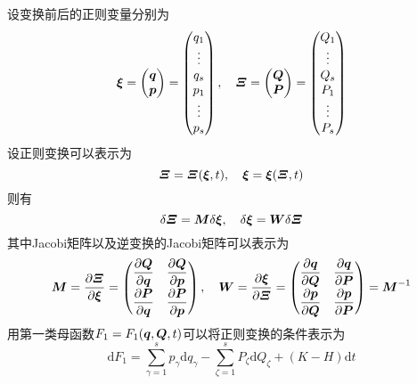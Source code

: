 设变换前后的正则变量分别为
\begin{equation*}
	\boldsymbol{\xi} = \begin{pmatrix} \boldsymbol{q} \\ \boldsymbol{p} \end{pmatrix} = \begin{pmatrix} q_1 \\ \vdots \\ q_s \\ p_1 \\ \vdots \\ p_s \end{pmatrix},\quad \boldsymbol{\mathnormal{\Xi}} = \begin{pmatrix} \boldsymbol{Q} \\ \boldsymbol{P} \end{pmatrix} = \begin{pmatrix} Q_1 \\ \vdots \\ Q_s \\ P_1 \\ \vdots \\ P_s \end{pmatrix}
\end{equation*}
设正则变换可以表示为
\begin{equation}
	\boldsymbol{\mathnormal{\Xi}} = \boldsymbol{\mathnormal{\Xi}}(\boldsymbol{\xi},t),\quad \boldsymbol{\xi} = \boldsymbol{\xi}(\boldsymbol{\mathnormal{\Xi}},t)
\end{equation}
则有
\begin{equation*}
	\delta \boldsymbol{\mathnormal{\Xi}} = \boldsymbol{M} \delta \boldsymbol{\xi},\quad \delta \boldsymbol{\xi} = \boldsymbol{W} \delta \boldsymbol{\mathnormal{\Xi}}
\end{equation*}
其中Jacobi矩阵以及逆变换的Jacobi矩阵可以表示为
\begin{equation}
	\boldsymbol{M} = \frac{\partial \boldsymbol{\mathnormal{\Xi}}}{\partial \boldsymbol{\xi}} = \begin{pmatrix} \dfrac{\partial \boldsymbol{Q}}{\partial \boldsymbol{q}} & \dfrac{\partial \boldsymbol{Q}}{\partial \boldsymbol{p}} \\[1.5ex] \dfrac{\partial \boldsymbol{P}}{\partial \boldsymbol{q}} & \dfrac{\partial \boldsymbol{P}}{\partial \boldsymbol{p}} \end{pmatrix},\quad \boldsymbol{W} = \frac{\partial \boldsymbol{\xi}}{\partial \boldsymbol{\mathnormal{\Xi}}} = \begin{pmatrix} \dfrac{\partial \boldsymbol{q}}{\partial \boldsymbol{Q}} & \dfrac{\partial \boldsymbol{q}}{\partial \boldsymbol{P}} \\[1.5ex] \dfrac{\partial \boldsymbol{p}}{\partial \boldsymbol{Q}} & \dfrac{\partial \boldsymbol{p}}{\partial \boldsymbol{P}} \end{pmatrix} = \boldsymbol{M}^{-1}
\end{equation}
用第一类母函数$F_1=F_1(\boldsymbol{q},\boldsymbol{Q},t)$可以将正则变换的条件表示为
\begin{equation*}
	\mathrm{d} F_1 = \sum_{\gamma=1}^s p_\gamma \mathrm{d} q_\gamma - \sum_{\zeta=1}^s P_\zeta \mathrm{d} Q_\zeta + (K-H)\mathrm{d} t
\end{equation*}
